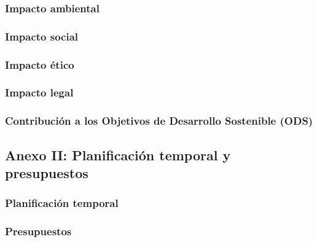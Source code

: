 \documentclass[a4paper, 12pt, spanish, twoside]{article}
\begin{document}
\subsubsection{Impacto ambiental} \label{sec:anexo1:ambiental}
\subsubsection{Impacto social} \label{sec:anexo1:social}
\subsubsection{Impacto ético} \label{sec:anexo1:etico}
\subsubsection{Impacto legal} \label{sec:anexo1:legal}
\subsubsection{Contribución a los Objetivos de Desarrollo Sostenible (ODS)} \label{sec:ods}

\clearpage




\newpage
\subsection{Anexo II: Planificación temporal y presupuestos} \label{sec:anexo2}
\subsubsection{Planificación temporal} \label{sec:anexo2:temporal}
\subsubsection{Presupuestos} \label{sec:anexo2:presupuestos}

\clearpage

\end{document}
